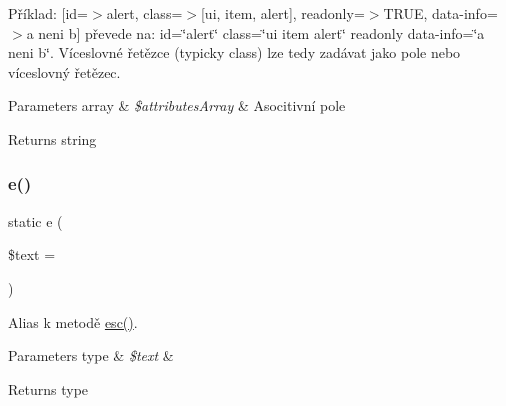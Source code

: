 Příklad\+: \mbox{[}\textquotesingle{}id\textquotesingle{}=$>$\textquotesingle{}alert\textquotesingle{}, \textquotesingle{}class\textquotesingle{}=$>$\mbox{[}\textquotesingle{}ui\textquotesingle{}, \textquotesingle{}item\textquotesingle{}, \textquotesingle{}alert\textquotesingle{}\mbox{]}, \textquotesingle{}readonly\textquotesingle{}=$>$T\+R\+UE, data-\/info=$>$\textquotesingle{}a neni b\textquotesingle{}\mbox{]} převede na\+: id=\char`\"{}alert\char`\"{} class=\char`\"{}ui item alert\char`\"{} readonly data-\/info=\char`\"{}a neni b\char`\"{}. Víceslovné řetězce (typicky class) lze tedy zadávat jako pole nebo víceslovný řetězec. 
\begin{DoxyParams}[1]{Parameters}
array & {\em \$attributes\+Array} & Asocitivní pole \\
\hline
\end{DoxyParams}
\begin{DoxyReturn}{Returns}
string 
\end{DoxyReturn}
\mbox{\label{class_pes_1_1_text_1_1_html_a66f9ba71608ca9d72eeb7a83f3653179}} 
\subsubsection{\texorpdfstring{e()}{e()}}
{\footnotesize\ttfamily static e (\begin{DoxyParamCaption}\item[{}]{\$text = {\ttfamily \textquotesingle{}\textquotesingle{}} }\end{DoxyParamCaption})\hspace{0.3cm}{\ttfamily [static]}}

Alias k metodě \mbox{\hyperlink{class_pes_1_1_text_1_1_html_ac33811074e05e46a937899da7a858e70}{esc()}}.


\begin{DoxyParams}[1]{Parameters}
type & {\em \$text} & \\
\hline
\end{DoxyParams}
\begin{DoxyReturn}{Returns}
type 
\end{DoxyReturn}
\mbox{\label{class_pes_1_1_text_1_1_html_ac33811074e05e46a937899da7a858e70}} 
